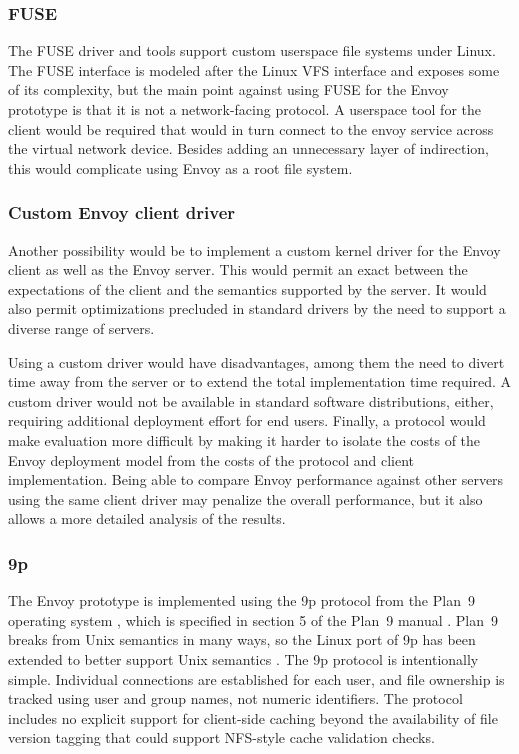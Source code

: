 \subsubsection{FUSE}

The FUSE driver and tools support custom userspace file systems under Linux. The FUSE interface is modeled after the Linux VFS interface and exposes some of its complexity, but the main point against using FUSE for the Envoy prototype is that it is not a network-facing protocol. A userspace tool for the client would be required that would in turn connect to the envoy service across the virtual network device. Besides adding an unnecessary layer of indirection, this would complicate using Envoy as a root file system.

\subsubsection{Custom Envoy client driver}

Another possibility would be to implement a custom kernel driver for the Envoy client as well as the Envoy server. This would permit an exact between the expectations of the client and the semantics supported by the server. It would also permit optimizations precluded in standard drivers by the need to support a diverse range of servers.

Using a custom driver would have disadvantages, among them the need to divert time away from the server or to extend the total implementation time required. A custom driver would not be available in standard software distributions, either, requiring additional deployment effort for end users. Finally, a protocol would make evaluation more difficult by making it harder to isolate the costs of the Envoy deployment model from the costs of the protocol and client implementation. Being able to compare Envoy performance against other servers using the same client driver may penalize the overall performance, but it also allows a more detailed analysis of the results.

\subsubsection{9p}

The Envoy prototype is implemented using the 9p protocol from the Plan~9 operating system \cite{pike90,pike92}, which is specified in section 5 of the Plan~9 manual \cite{9man}. Plan~9 breaks from Unix semantics in many ways, so the Linux port of 9p has been extended to better support Unix semantics \cite{hensbergen}. The 9p protocol is intentionally simple. Individual connections are established for each user, and file ownership is tracked using user and group names, not numeric identifiers. The protocol includes no explicit support for client-side caching beyond the availability of file version tagging that could support NFS-style cache validation checks.

